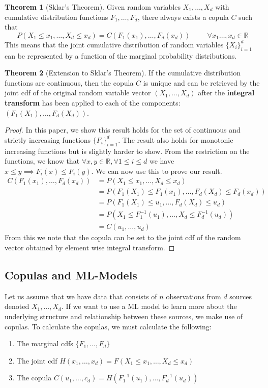 \documentclass[12pt]{article}
\def\inv{^{-1}}
\newcommand{\ds}{\displaystyle}
\theoremstyle{definition}
\newtheorem{theorem}{Theorem}
\theoremstyle{definition}
\begin{document}
\noindent \begin{theorem}[Sklar's Theorem] Given random variables $X_1,\hdots,X_d$ with cumulative distribution functions $F_1,\hdots,F_d$, there always exists a copula $C$ such that 
$$P(X_1\leq x_1, \hdots, X_d\leq x_d)=C( F_1(x_1),\hdots ,F_d(x_d))\hspace{1cm}\forall x_1\hdots,x_d\in\mathbb{R}$$
This means that the joint cumulative distribution of random variables $\ds \{X_i\}_{i=1}^d $ can be represented by a function of the marginal probability distributions.
\end{theorem}
\begin{theorem}[Extension to Sklar's Theorem]
If the cumulative distribution functions are continuous, then the copula $C$ is unique and can be retrieved by the joint cdf of the original random variable vector $(X_1,\hdots,X_d)$ after the \textbf{integral transform} has been applied to each of the components: $(F_1(X_1),\hdots,F_d(X_d))$.
\begin{proof}
In this paper, we show this result holds for the set of continuous and strictly increasing functions $\ds \{F_i\}_{i=1}^d$. The result also holds for monotonic increasing functions but is slightly harder to show.
From the restriction on the functions, we know that $\forall x,y \in \mathbb{R} ,\forall 1\leq i\leq d$ we have $x\leq y\implies F_i(x)\leq F_i(y)$. We can now use this to prove our result. 
\begin{align*}
    C( F_1(x_1),\hdots ,F_d(x_d))&=P(X_1\leq x_1,\hdots, X_d\leq x_d)\\
    &=P(F_1(X_1)\leq F_1(x_1),\hdots,F_d(X_d)\leq F_d(x_d))\\
    &=P(F_1(X_1)\leq u_1,\hdots,F_d(X_d)\leq u_d)\\
    &=P(X_1\leq F_1^{-1}(u_1),\hdots,X_d\leq F_d^{-1}(u_d))\\
    &=C(u_1,\hdots,u_d)
\end{align*}
From this we note that the copula can be set to the joint cdf of the random vector obtained by element wise integral transform.
\end{proof}

\end{theorem}


\subsection{Copulas and ML-Models}
Let us assume that we have data that consists of  $n$ observations from $d$ sources denoted $X_1,\hdots, X_d$. If we want to use a ML model to learn more about the underlying structure and relationship between these sources, we make use of copulas. To calculate the copulas, we must calculate the following:
\begin{enumerate}
    \item The marginal cdfs $\ds\{F_1, \hdots, F_d\}$ \item The joint cdf $H(x_1,\hdots,x_d)=F(X_1\leq x_1, \hdots, X_d\leq x_d)$
    \item The copula $C(u_1,\hdots,c_d)=H(F\inv_1(u_1),\hdots,F\inv_d(u_d))$
\end{enumerate}
\end{document}
